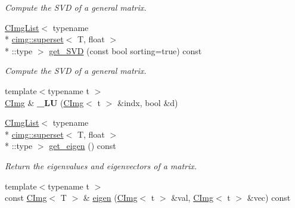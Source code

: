 \begin{DoxyCompactItemize}
\begin{DoxyCompactList}\small\item\em Compute the S\-V\-D of a general matrix. \end{DoxyCompactList}\item 
\hypertarget{structcimg__library_1_1_c_img_a7dc9b98891aab8ffef05c2e6265fa0b8}{\hyperlink{structcimg__library_1_1_c_img_list}{C\-Img\-List}$<$ typename \\*
\hyperlink{structcimg__library_1_1cimg_1_1superset}{cimg\-::superset}$<$ T, float $>$\\*
\-::type $>$ \hyperlink{structcimg__library_1_1_c_img_a7dc9b98891aab8ffef05c2e6265fa0b8}{get\-\_\-\-S\-V\-D} (const bool sorting=true) const }\label{structcimg__library_1_1_c_img_a7dc9b98891aab8ffef05c2e6265fa0b8}

\begin{DoxyCompactList}\small\item\em Compute the S\-V\-D of a general matrix. \end{DoxyCompactList}\item 
\hypertarget{structcimg__library_1_1_c_img_a4368443b74f156fefd1d6bbb2dc3fc87}{{\footnotesize template$<$typename t $>$ }\\\hyperlink{structcimg__library_1_1_c_img}{C\-Img} \& {\bfseries \-\_\-\-L\-U} (\hyperlink{structcimg__library_1_1_c_img}{C\-Img}$<$ t $>$ \&indx, bool \&d)}\label{structcimg__library_1_1_c_img_a4368443b74f156fefd1d6bbb2dc3fc87}

\item 
\hypertarget{structcimg__library_1_1_c_img_a5b9c4cf868842a1e06c1c51e46f560c9}{\hyperlink{structcimg__library_1_1_c_img_list}{C\-Img\-List}$<$ typename \\*
\hyperlink{structcimg__library_1_1cimg_1_1superset}{cimg\-::superset}$<$ T, float $>$\\*
\-::type $>$ \hyperlink{structcimg__library_1_1_c_img_a5b9c4cf868842a1e06c1c51e46f560c9}{get\-\_\-eigen} () const }\label{structcimg__library_1_1_c_img_a5b9c4cf868842a1e06c1c51e46f560c9}

\begin{DoxyCompactList}\small\item\em Return the eigenvalues and eigenvectors of a matrix. \end{DoxyCompactList}\item 
\hypertarget{structcimg__library_1_1_c_img_a3a1122a2bb12dce3857a966c5a9878bb}{{\footnotesize template$<$typename t $>$ }\\const \hyperlink{structcimg__library_1_1_c_img}{C\-Img}$<$ T $>$ \& \hyperlink{structcimg__library_1_1_c_img_a3a1122a2bb12dce3857a966c5a9878bb}{eigen} (\hyperlink{structcimg__library_1_1_c_img}{C\-Img}$<$ t $>$ \&val, \hyperlink{structcimg__library_1_1_c_img}{C\-Img}$<$ t $>$ \&vec) const }\label{structcimg__library_1_1_c_img_a3a1122a2bb12dce3857a966c5a9878bb}


\end{DoxyCompactItemize}
